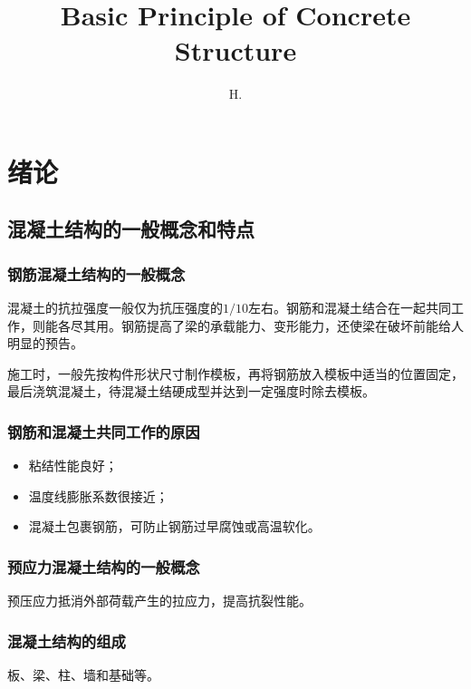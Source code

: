 \documentclass{article}
\begin{document}
\title{Basic Principle of Concrete Structure}
\author{H.}
\maketitle
\newpage
\tableofcontents
\newpage
\section{绪论}
\subsection{混凝土结构的一般概念和特点}
\subsubsection{钢筋混凝土结构的一般概念}
\par 混凝土的抗拉强度一般仅为抗压强度的$1/10$左右。钢筋和混凝土结合在一起共同工作，则能各尽其用。钢筋提高了梁的承载能力、变形能力，还使梁在破坏前能给人明显的预告。
\par 施工时，一般先按构件形状尺寸制作模板，再将钢筋放入模板中适当的位置固定，最后浇筑混凝土，待混凝土结硬成型并达到一定强度时除去模板。
\subsubsection{钢筋和混凝土共同工作的原因}
\begin{itemize}
      \item 粘结性能良好；
      \item 温度线膨胀系数很接近；
      \item 混凝土包裹钢筋，可防止钢筋过早腐蚀或高温软化。
\end{itemize}
\subsubsection{预应力混凝土结构的一般概念}
\par 预压应力抵消外部荷载产生的拉应力，提高抗裂性能。
\subsubsection{混凝土结构的组成}
\par 板、梁、柱、墙和基础等。
\end{document}

